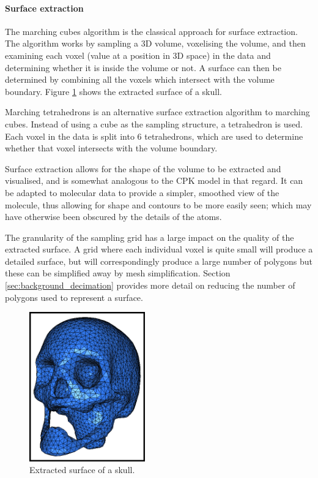 
\paragraph{Surface extraction}

The marching cubes algorithm \citep{lorensen87} is the classical approach for
surface extraction. The algorithm works by sampling a 3D volume, voxelising the
volume, and then examining each voxel (value at a position in 3D space) in the
data and determining whether it is inside the volume or not. A surface can then
be determined by combining all the voxels which intersect with the volume
boundary. Figure \ref{fig:background_mesh} shows the extracted surface of a
skull.

Marching tetrahedrons is an alternative surface extraction algorithm to
marching cubes. Instead of using a cube as the sampling structure, a
tetrahedron is used. Each voxel in the data is split into 6 tetrahedrons, which
are used to determine whether that voxel intersects with the volume boundary.

Surface extraction allows for the shape of the volume to be extracted and
visualised, and is somewhat analogous to the CPK model in that regard. It can
be adapted to molecular data to provide a simpler, smoothed view of the
molecule, thus allowing for shape and contours to be more easily seen; which
may have otherwise been obscured by the details of the atoms.

The granularity of the sampling grid has a large impact on the quality of the
extracted surface. A grid where each individual voxel is quite small will
produce a detailed surface, but will correspondingly produce a large number of
polygons but these can be simplified away by mesh simplification. Section
\ref{sec:background_decimation} provides more detail on reducing the number of
polygons used to represent a surface.

\begin{figure}
  \begin{center}
    \includegraphics[width=50mm]{surface_mesh}
  \end{center}
  \caption{Extracted surface of a skull.}
  \label{fig:background_mesh}
\end{figure}

